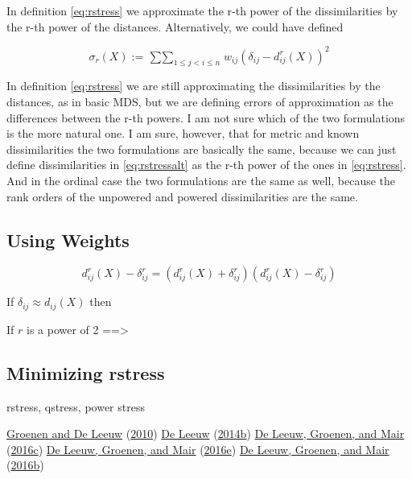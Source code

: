 \documentclass[
  12pt,
]{book}
\theoremstyle{definition}
\theoremstyle{definition}
\theoremstyle{definition}
\theoremstyle{definition}
\theoremstyle{remark}
\begin{document}
In definition \eqref{eq:rstress} we approximate the r-th power of the dissimilarities by the r-th power of the distances. Alternatively, we could have
defined

\begin{equation}
\sigma_r(X):=\mathop{\sum\sum}_{1\leq j<i\leq n}w_{ij}(\delta_{ij}-d_{ij}^{r}(X))^2
\label{eq:rstressalt}
\end{equation}

In definition \eqref{eq:rstress} we are still approximating the
dissimilarities by the distances, as in basic MDS, but we are
defining errors of approximation as the differences between the
r-th powers. I am not sure which of the two formulations is the more natural one.
I am sure, however, that for metric and known dissimilarities the two
formulations are basically the same, because we can just define
dissimilarities in \eqref{eq:rstressalt} as the r-th power of the ones in
\eqref{eq:rstress}. And in the ordinal case the two formulations are
the same as well, because the rank orders of the unpowered and powered
dissimilarities are the same.

\hypertarget{using-weights}{%
\subsection{Using Weights}\label{using-weights}}

\[
d_{ij}^{r}(X)-\delta_{ij}^{r}=
(d_{ij}^{r}(X)+\delta_{ij}^{r})(d_{ij}^{r}(X)-\delta_{ij}^{r})
\]

If \(\delta_{ij}\approx d_{ij}(X)\) then

If \(r\) is a power of 2 ==\textgreater{}

\hypertarget{minimizing-rstress}{%
\subsection{Minimizing rstress}\label{minimizing-rstress}}

rstress, qstress, power stress

\protect\hyperlink{ref-groenen_deleeuw_U_10}{Groenen and De Leeuw} (\protect\hyperlink{ref-groenen_deleeuw_U_10}{2010})
\protect\hyperlink{ref-deleeuw_U_14c}{De Leeuw} (\protect\hyperlink{ref-deleeuw_U_14c}{2014b})
\protect\hyperlink{ref-deleeuw_groenen_mair_E_16a}{De Leeuw, Groenen, and Mair} (\protect\hyperlink{ref-deleeuw_groenen_mair_E_16a}{2016c})
\protect\hyperlink{ref-deleeuw_groenen_mair_E_16c}{De Leeuw, Groenen, and Mair} (\protect\hyperlink{ref-deleeuw_groenen_mair_E_16c}{2016e})
\protect\hyperlink{ref-deleeuw_groenen_mair_E_16h}{De Leeuw, Groenen, and Mair} (\protect\hyperlink{ref-deleeuw_groenen_mair_E_16h}{2016b})
\end{document}
